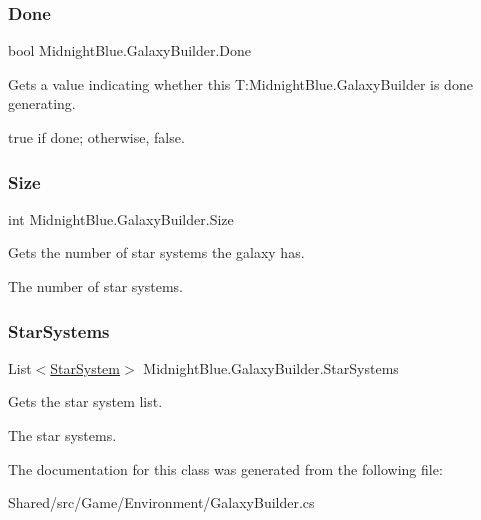 \subsubsection{\texorpdfstring{Done}{Done}}
{\footnotesize\ttfamily bool Midnight\+Blue.\+Galaxy\+Builder.\+Done\hspace{0.3cm}{\ttfamily [get]}}



Gets a value indicating whether this T\+:\+Midnight\+Blue.\+Galaxy\+Builder is done generating. 

{\ttfamily true} if done; otherwise, {\ttfamily false}.\hypertarget{class_midnight_blue_1_1_galaxy_builder_a295af2d47a68bdac0845f3540c815a63}{}\label{class_midnight_blue_1_1_galaxy_builder_a295af2d47a68bdac0845f3540c815a63} 
\subsubsection{\texorpdfstring{Size}{Size}}
{\footnotesize\ttfamily int Midnight\+Blue.\+Galaxy\+Builder.\+Size\hspace{0.3cm}{\ttfamily [get]}}



Gets the number of star systems the galaxy has. 

The number of star systems.\hypertarget{class_midnight_blue_1_1_galaxy_builder_a85ce4bbc7de1c14ad7e7f0af3e92c1a1}{}\label{class_midnight_blue_1_1_galaxy_builder_a85ce4bbc7de1c14ad7e7f0af3e92c1a1} 
\subsubsection{\texorpdfstring{Star\+Systems}{StarSystems}}
{\footnotesize\ttfamily List$<$\hyperlink{class_midnight_blue_1_1_star_system}{Star\+System}$>$ Midnight\+Blue.\+Galaxy\+Builder.\+Star\+Systems\hspace{0.3cm}{\ttfamily [get]}}



Gets the star system list. 

The star systems.

The documentation for this class was generated from the following file\+:\begin{DoxyCompactItemize}
\item 
Shared/src/\+Game/\+Environment/Galaxy\+Builder.\+cs\end{DoxyCompactItemize}
